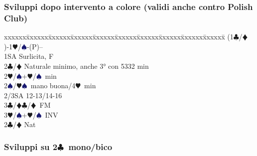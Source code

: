 \documentclass[a4paper,italian]{article}
\newcommand{\BC}{\textcolor{OliveGreen}{$\clubsuit$}}
\newcommand{\BD}{\textcolor{RedOrange}{$\vardiamondsuit$}}
\newcommand{\BH}{\textcolor{Red2}{$\varheartsuit${}}}
\newcommand{\BS}{\textcolor{MidnightBlue}{$\spadesuit${}}}
\newcommand{\pdfc}{\texorpdfstring{\BC{}}{C}}
\newenvironment{bidtable}
{\begin{tabbing}

    xxxxxx\=xxxxxx\=xxxxxx\=xxxxxx\=xxxxxx\=xxxxxx\=xxxxxx\=xxxxxx\=xxxxxx\=xxxxxx\=\kill}
{\end{tabbing} }%
\begin{document}
\begin{multicols}{2}
                                        \subsubsection{Sviluppi dopo intervento a colore (validi anche contro Polish Club)}
                                        \begin{bidtable}
                                            (1\BC/\BD)-1\BH/\BS-(P)--\\
                                            1SA \> Surlicita, F\+\\
                                            2\BC/\BD \> Naturale minimo, anche 3° con 5332 min\\
                                            2\BH/\BS {}+\BH/\BS\ min\\
                                            2\BS/\BH {}\BS\ mano buona/4\BH\ min\\
                                            2/3SA  12-13/14-16\\
                                            3\BC/\BD {}\BC/\BD\ FM\\
                                            3\BH/\BS {}+\BH/\BS\ INV\-\\
                                            2\BC/\BD \> Nat\\
                                        \end{bidtable}

                                        \subsubsection{Sviluppi su 2\pdfc\ mono/bico}


\end{multicols}
\end{document}

